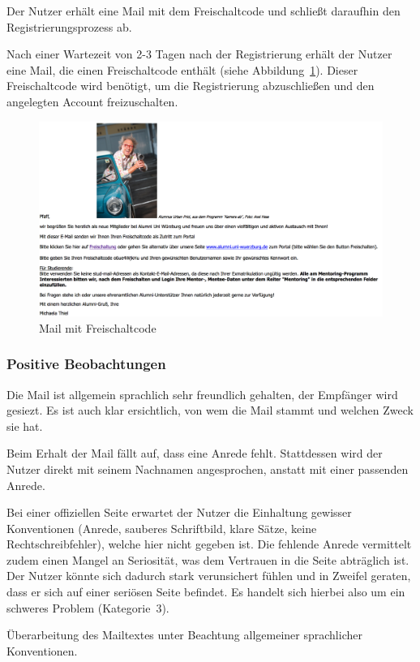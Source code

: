 \newpage
{}
\label{subsec:freischaltung}
Der Nutzer erhält eine Mail mit dem Freischaltcode und schließt daraufhin den Registrierungsprozess ab.

Nach einer Wartezeit von 2-3 Tagen nach der Registrierung erhält der Nutzer eine Mail, die einen Freischaltcode enthält (siehe Abbildung~\ref{fig:regmail}). Dieser Freischaltcode wird benötigt, um die Registrierung abzuschließen und den angelegten Account freizuschalten.

\begin{figure}
	\centering
		\includegraphics[width=\textwidth]{figures/regmail.jpg}
	\caption{Mail mit Freischaltcode}
	\label{fig:regmail}
\end{figure}

\subsubsection*{Positive Beobachtungen}
\label{subsubsec:freischaltung_mail_positiv}

Die Mail ist allgemein sprachlich sehr freundlich gehalten, der Empfänger wird gesiezt. Es ist auch klar ersichtlich, von wem die Mail stammt und welchen Zweck sie hat.

{
Beim Erhalt der Mail fällt auf, dass eine Anrede fehlt. Stattdessen wird der Nutzer direkt mit seinem Nachnamen angesprochen, anstatt mit einer passenden Anrede.
}
{

Bei einer offiziellen Seite erwartet der Nutzer die Einhaltung gewisser Konventionen (Anrede, sauberes Schriftbild, klare Sätze, keine Rechtschreibfehler), welche hier nicht gegeben ist. Die fehlende Anrede vermittelt zudem einen Mangel an Seriosität, was dem Vertrauen in die Seite abträglich ist. Der Nutzer könnte sich dadurch stark verunsichert fühlen und in Zweifel geraten, dass er sich auf einer seriösen Seite befindet. Es handelt sich hierbei also um ein schweres Problem (Kategorie~3).
}
{
Überarbeitung des Mailtextes unter Beachtung allgemeiner sprachlicher Konventionen.
}
\label{prob:frei:mailanrede}

